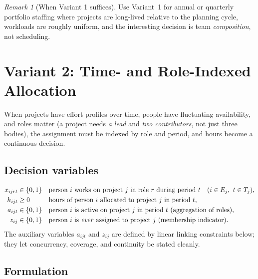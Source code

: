 \documentclass[11pt]{article}
\newcommand{\B}{\{0,1\}}
\theoremstyle{remark}
\newtheorem{remark}{Remark}[section]
\begin{document}
\begin{remark}[When Variant 1 suffices]
Use Variant~1 for annual or quarterly portfolio staffing where projects are
long-lived relative to the planning cycle, workloads are roughly uniform,
and the interesting decision is team \emph{composition}, not scheduling.
\end{remark}

\section{Variant 2: Time- and Role-Indexed Allocation}

When projects have effort profiles over time, people have fluctuating
availability, and roles matter (a project needs \emph{a lead} and
\emph{two contributors}, not just three bodies), the assignment must be
indexed by role and period, and hours become a continuous decision.

\subsection{Decision variables}
\begin{align*}
x_{ijrt} &\in \B
  && \text{person $i$ works on project $j$ in role $r$ during period $t$}
  \quad (i \in E_j,\ t \in T_j), \\
h_{ijt} &\ge 0
  && \text{hours of person $i$ allocated to project $j$ in period $t$}, \\
a_{ijt} &\in \B
  && \text{person $i$ is active on project $j$ in period $t$
      (aggregation of roles)}, \\
z_{ij} &\in \B
  && \text{person $i$ is \emph{ever} assigned to project $j$
      (membership indicator)}.
\end{align*}
The auxiliary variables $a_{ijt}$ and $z_{ij}$ are defined by linear
linking constraints below; they let concurrency, coverage, and continuity
be stated cleanly.

\subsection{Formulation}
\end{document}
